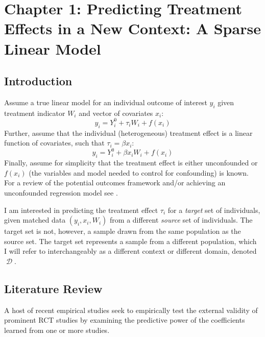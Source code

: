 \documentclass[a4paper,12pt]{article}
\DeclareMathOperator*{\D}{\mathcal{D}}
\begin{document}
\section{ Chapter 1: Predicting Treatment Effects in a New Context: A Sparse Linear Model }

\subsection{ Introduction }

Assume a true linear model for an individual outcome of interest $y_i$ given treatment indicator $W_i$ and vector of covariates $x_i$:
%
$$
y_i = Y^0_i + \tau_i W_i + f(x_i)
$$
%
Further, assume that the individual (heterogeneous) treatment effect is a linear function of covariates, such that $\tau_i = \beta x_i$:
%
$$
y_i = Y^0_i + \beta x_iW_i + f(x_i)
$$
%
Finally, assume for simplicity that the treatment effect is either unconfounded or $f(x_i)$ (the variables and model needed to control for confounding) is known. For a review of the potential outcomes framework and/or achieving an unconfounded regression model see \cite{Holland1986, imbens2015causal}.

I am interested in predicting the treatment effect $\tau_i$ for a \textit{target} set of individuals, given matched data $(y_i, x_i, W_i)$ from a different \textit{source} set of individuals. The target set is not, however, a sample drawn from the same population as the source set. The target set represents a sample from a different population, which I will refer to interchangeably as a different context or different domain, denoted $\D$.


\subsection{ Literature Review }

A host of recent empirical studies seek to empirically test the external validity of prominent RCT studies by examining the predictive power of the coefficients learned from one or more studies.
\end{document}
